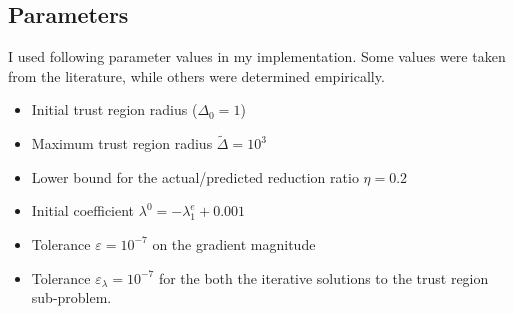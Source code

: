 \documentclass[a4paper]{article}
\begin{document}
\subsection{Parameters}
I used following parameter values in my implementation. Some values were taken
from the literature, while others were determined empirically.
\begin{itemize}
\item Initial trust region radius ($\Delta_0 = 1$)
\item Maximum trust region radius $\tilde{\Delta}=10^3$
\item Lower bound for the actual/predicted reduction ratio $\eta=0.2$
\item Initial coefficient $\lambda^{0}= -\lambda_1^e + 0.001$
\item Tolerance $\varepsilon = 10^{-7}$ on the gradient magnitude
\item Tolerance $\varepsilon_{\lambda} = 10^{-7}$ for the both
  the iterative solutions to the trust region sub-problem.
\end{itemize}
\end{document}
